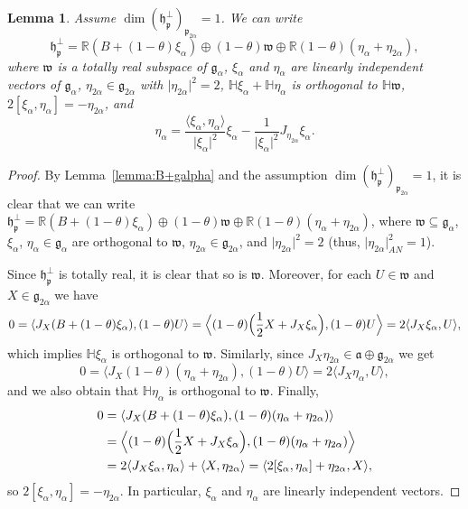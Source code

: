 \documentclass[12pt, a4paper]{amsart}
\newcommand{\g}{\mathfrak}
\newcommand{\R}{\mathbb{R}}
\renewcommand{\H}{\mathbb{H}}
\newtheorem{lemma}[theorem]{Lemma}
\theoremstyle{definition}
\begin{document}
\begin{lemma}\label{lemma:spperp}
Assume $\dim(\g{h}_\g{p}^\perp)_{\g{p}_{2\alpha}}=1$.
We can write
\[
\g{h}_{\g{p}}^\perp
=\R(B+(1-\theta)\xi_\alpha)\oplus(1-\theta)\g{w}\oplus\R(1-\theta)(\eta_\alpha+\eta_{2\alpha}),
\]
where $\g{w}$ is a totally real subspace of $\g{g}_\alpha$, $\xi_\alpha$ and $\eta_\alpha$ are linearly independent vectors of $\g{g}_\alpha$, $\eta_{2\alpha}\in\g{g}_{2\alpha}$ with $\lvert\eta_{2\alpha}\rvert^2=2$, $\H\xi_\alpha+\H\eta_\alpha$ is orthogonal to $\H\g{w}$, 
$2[\xi_\alpha,\eta_\alpha]=-\eta_{2\alpha}$,
and
\[
\eta_\alpha
=\frac{\langle\xi_\alpha,\eta_\alpha\rangle}{\lvert\xi_\alpha\rvert^2}\xi_\alpha
-\frac{1}{\lvert\xi_\alpha\rvert^2}J_{\eta_{2\alpha}}\xi_\alpha.
\]
\end{lemma}

\begin{proof}
By Lemma~\ref{lemma:B+galpha} and the assumption $\dim(\g{h}_{\g{p}}^\perp)_{\g{p}_{2\alpha}}= 1$, it is clear that we can write
$\g{h}_{\g{p}}^\perp
=\R(B+(1-\theta)\xi_\alpha)\oplus(1-\theta)\g{w}\oplus\R(1-\theta)(\eta_\alpha+\eta_{2\alpha})$,
where $\g{w}\subseteq\g{g}_\alpha$, $\xi_\alpha$, $\eta_\alpha\in\g{g}_\alpha$ are orthogonal to $\g{w}$, $\eta_{2\alpha}\in\g{g}_{2\alpha}$, and $\lvert\eta_{2\alpha}\rvert^2=2$ (thus, $\lvert\eta_{2\alpha}\rvert_{AN}^2=1$).

Since $\g{h}_{\g{p}}^\perp$ is totally real, it is clear that so is $\g{w}$.
Moreover, for each $U\in\g{w}$ and $X\in\g{g}_{2\alpha}$ we have
\[
0
=\langle J_X(B+(1-\theta)\xi_\alpha),(1-\theta)U\rangle
=\Bigl\langle (1-\theta)\Bigl(\frac{1}{2}X+J_X\xi_\alpha\Bigr),(1-\theta)U\Bigr\rangle
=2\langle J_X\xi_\alpha,U\rangle,
\]
which implies $\H\xi_\alpha$ is orthogonal to $\g{w}$.
Similarly, since $J_X\eta_{2\alpha}\in\g{a}\oplus\g{g}_{2\alpha}$ we get
\[
0
=\langle J_X(1-\theta)(\eta_\alpha+\eta_{2\alpha}),(1-\theta)U\rangle
=2\langle J_X\eta_\alpha,U\rangle,
\]
and we also obtain that $\H\eta_\alpha$ is orthogonal to $\g{w}$.
Finally,
\begin{align*}
0
&{}=\langle J_{X}(B+(1-\theta)\xi_\alpha),(1-\theta)(\eta_\alpha+\eta_{2\alpha})\rangle\\
&{}=\Bigl\langle (1-\theta)\Bigl(\frac{1}{2}X+J_{X}\xi_\alpha\Bigr),
(1-\theta)(\eta_\alpha+\eta_{2\alpha})\Bigr\rangle\\
&{}=2\langle J_{X}\xi_\alpha,\eta_\alpha\rangle+\langle X,\eta_{2\alpha}\rangle
=\langle 2[\xi_\alpha,\eta_\alpha]+\eta_{2\alpha},X\rangle,
\end{align*}
so $2[\xi_\alpha,\eta_\alpha]=-\eta_{2\alpha}$.
In particular, $\xi_\alpha$ and $\eta_\alpha$ are linearly independent vectors.


\end{proof}
\end{document}
